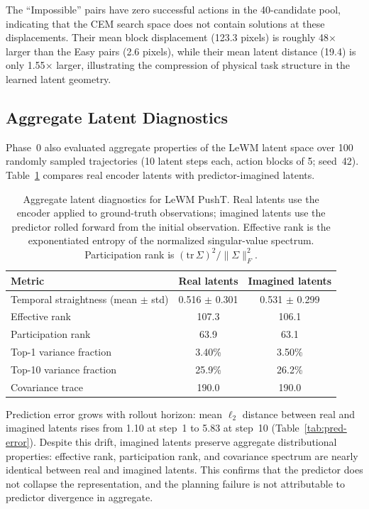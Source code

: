The ``Impossible'' pairs have zero successful actions in the 40-candidate pool,
indicating that the CEM search space does not contain solutions at these
displacements.  Their mean block displacement (123.3 pixels) is roughly 48$\times$
larger than the Easy pairs (2.6 pixels), while their mean latent distance
(19.4) is only 1.55$\times$ larger, illustrating the compression of physical
task structure in the learned latent geometry.

\subsection{Aggregate Latent Diagnostics}
\label{app:latent-diag}

Phase~0 also evaluated aggregate properties of the LeWM latent space over 100
randomly sampled trajectories (10 latent steps each, action blocks of 5;
seed~42).  Table~\ref{tab:latent-diagnostics} compares real encoder latents
with predictor-imagined latents.

\begin{table}[h]
\centering
\caption{Aggregate latent diagnostics for LeWM PushT.  Real latents use the
encoder applied to ground-truth observations; imagined latents use the
predictor rolled forward from the initial observation.  Effective rank is the
exponentiated entropy of the normalized singular-value spectrum.
Participation rank is $(\text{tr}\,\Sigma)^2 / \|\Sigma\|_F^2$.}
\label{tab:latent-diagnostics}
\begin{tabular}{lcc}
\toprule
Metric & Real latents & Imagined latents \\
\midrule
Temporal straightness (mean $\pm$ std) & 0.516 $\pm$ 0.301 & 0.531 $\pm$ 0.299 \\
Effective rank & 107.3 & 106.1 \\
Participation rank & 63.9 & 63.1 \\
Top-1 variance fraction & 3.40\% & 3.50\% \\
Top-10 variance fraction & 25.9\% & 26.2\% \\
Covariance trace & 190.0 & 190.0 \\
\bottomrule
\end{tabular}
\end{table}

Prediction error grows with rollout horizon: mean $\ell_2$ distance between
real and imagined latents rises from 1.10 at step~1 to 5.83 at step~10
(Table~\ref{tab:pred-error}).  Despite this drift, imagined latents preserve
aggregate distributional properties: effective rank, participation rank, and
covariance spectrum are nearly identical between real and imagined latents.
This confirms that the predictor does not collapse the representation, and the
planning failure is not attributable to predictor divergence in aggregate.

